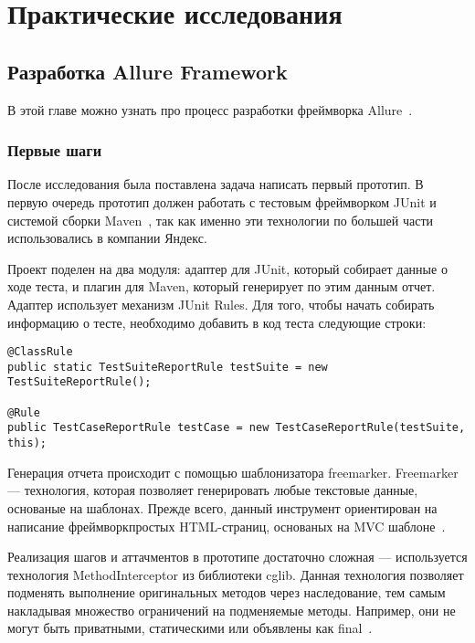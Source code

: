 \chapter{Практические исследования} 
\label{chapter3}

\section{Разработка Allure Framework}

В этой главе можно узнать про процесс разработки фреймворка Allure~\cite{allure_home}.

\subsection{Первые шаги}

После исследования была поставлена задача написать первый прототип. В первую очередь прототип должен работать с тестовым фреймворком JUnit и системой сборки Maven~\cite{maven_home}, так как именно эти технологии по большей части использовались в компании Яндекс. 

Проект поделен на два модуля: адаптер для JUnit, который собирает данные о ходе теста, и плагин для Maven, который генерирует по этим данным отчет. Адаптер использует механизм JUnit Rules. Для того, чтобы начать собирать информацию о тесте, необходимо добавить в код теста следующие строки:

\begin{lstlisting}[caption=Пример подключения к тестам JUnit Rules.]
@ClassRule
public static TestSuiteReportRule testSuite = new TestSuiteReportRule();

@Rule
public TestCaseReportRule testCase = new TestCaseReportRule(testSuite, this);
\end{lstlisting}


Генерация отчета происходит с помощью шаблонизатора freemarker. Freemarker --- технология, которая позволяет генерировать любые текстовые данные, основаные на шаблонах. Прежде всего, данный инструмент ориентирован на написание фреймворкпростых HTML-страниц, основаных на MVC шаблоне~\cite{freemarker_home}.

Реализация шагов и аттачментов в прототипе достаточно сложная --- используется технология MethodInterceptor из библиотеки cglib. Данная технология позволяет подменять выполнение оригинальных методов через наследование, тем самым накладывая множество ограничений на подменяемые методы. Например, они не могут быть приватными, статическими или объявлены как final~\cite{cglib_home}. 

